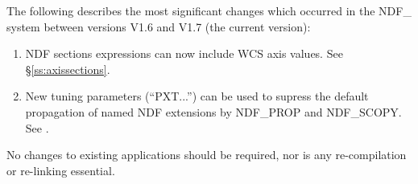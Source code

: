 The following describes the most significant changes which occurred in
the NDF\_ system between versions V1.6 and V1.7 (the current version):

\begin{enumerate}
\item NDF sections expressions can now include WCS axis values.
See \S\ref{ss:axissections}.

\item New tuning parameters (``PXT...'') can be used to supress the default
propagation of named NDF extensions by NDF\_PROP and NDF\_SCOPY. See 
.

\end{enumerate}

No changes to existing applications should be required, nor is any
re-compilation or re-linking essential.



